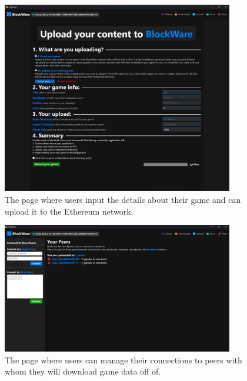 \begin{figure}[H]
  \centering
  \includegraphics[width=0.9\textwidth]{assets/images/screenshots/upload.png}
  \caption{The page where users input the details about their game and can upload it to the Ethereum network.}
\end{figure}

\begin{figure}[H]
  \centering
  \includegraphics[width=0.9\textwidth]{assets/images/screenshots/peers.png}
  \caption{The page where users can manage their connections to peers with whom they will download game data off of.}
\end{figure}

